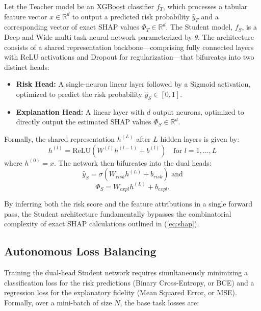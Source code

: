 \documentclass{wscpaperproc}
\theoremstyle{wsc}
\begin{document}
Let the Teacher model be an XGBoost classifier $f_T$, which processes a tabular feature vector $x \in \mathbb{R}^d$ to output a predicted risk probability $\hat{y}_T$ and a corresponding vector of exact SHAP values $\Phi_T \in \mathbb{R}^d$. The Student model, $f_S$, is a Deep and Wide multi-task neural network parameterized by $\theta$. The architecture consists of a shared representation backbone—comprising fully connected layers with ReLU activations and Dropout for regularization—that bifurcates into two distinct heads:
\begin{itemize}
\item \textbf{Risk Head:} A single-neuron linear layer followed by a Sigmoid activation, optimized to predict the risk probability $\hat{y}_S \in [0,1]$.
\item \textbf{Explanation Head:} A linear layer with $d$ output neurons, optimized to directly output the estimated SHAP values $\Phi_S \in \mathbb{R}^d$.
\end{itemize}

Formally, the shared representation $h^{(L)}$ after $L$ hidden layers is given by:
\begin{equation} %
    h^{(l)} = \text{ReLU}\left(W^{(l)} h^{(l-1)} + b^{(l)}\right) \quad \text{for } l = 1, \dots, L
\end{equation}
where $h^{(0)} = x$. The network then bifurcates into the dual heads:
\begin{equation*} %
    \hat{y}_{S} = \sigma\left(W_{risk} h^{(L)} + b_{risk}\right)\text{ and}
\end{equation*}
\begin{equation*} %
    \Phi_{S} = W_{expl} h^{(L)} + b_{expl} \text{.}
\end{equation*}

By inferring both the risk score and the feature attributions in a single forward pass, the Student architecture fundamentally bypasses the combinatorial complexity of exact SHAP calculations outlined in (\ref{eq:shap}).

\subsection{Autonomous Loss Balancing}

Training the dual-head Student network requires simultaneously minimizing a classification loss for the risk predictions (Binary Cross-Entropy, or BCE) and a regression loss for the explanatory fidelity (Mean Squared Error, or MSE). Formally, over a mini-batch of size $N$, the base task losses are:
\end{document}
